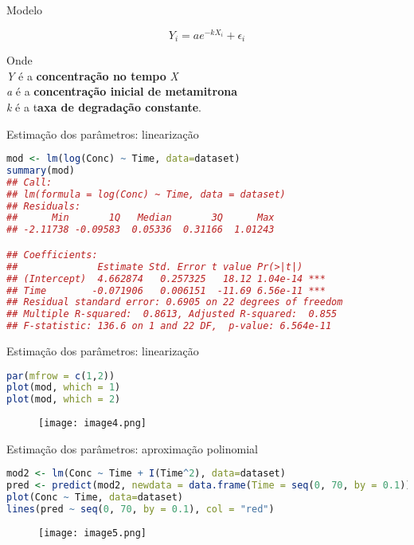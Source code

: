 \documentclass[xcolor=dvipsnames]{beamer}
\begin{document}
         \begin{frame}{Modelo}

        \textit{$$Y_{i} = ae^{-kX_i}+\epsilon_i$$}

       Onde \\
       \textit{Y} é a \textbf{concentração no tempo} \textit{X} \\
       \textit{a} é a \textbf{concentração inicial de metamitrona} \\
       \textit{k} é a t\textbf{axa de degradação constante}.
             
         \end{frame}

        \begin{frame}[fragile]{Estimação dos parâmetros: linearização}
           \begin{lstlisting}[language=R]
mod <- lm(log(Conc) ~ Time, data=dataset)
summary(mod)
## Call:
## lm(formula = log(Conc) ~ Time, data = dataset)
## Residuals:
##      Min       1Q   Median       3Q      Max 
## -2.11738 -0.09583  0.05336  0.31166  1.01243 

## Coefficients:
##              Estimate Std. Error t value Pr(>|t|)    
## (Intercept)  4.662874   0.257325   18.12 1.04e-14 ***
## Time        -0.071906   0.006151  -11.69 6.56e-11 ***
## Residual standard error: 0.6905 on 22 degrees of freedom
## Multiple R-squared:  0.8613, Adjusted R-squared:  0.855 
## F-statistic: 136.6 on 1 and 22 DF,  p-value: 6.564e-11
           \end{lstlisting}
        \end{frame} 
        
        \begin{frame}[fragile]{Estimação dos parâmetros: linearização}
           \begin{lstlisting}[language=R]
par(mfrow = c(1,2))
plot(mod, which = 1)
plot(mod, which = 2)
           \end{lstlisting}
           \begin{figure}[h]
           \texttt{[image: image4.png]}        
          \end{figure}          
        \end{frame}

         \begin{frame}[fragile]{Estimação dos parâmetros: aproximação polinomial}
           \begin{lstlisting}[language=R]
mod2 <- lm(Conc ~ Time + I(Time^2), data=dataset)
pred <- predict(mod2, newdata = data.frame(Time = seq(0, 70, by = 0.1)))
plot(Conc ~ Time, data=dataset)
lines(pred ~ seq(0, 70, by = 0.1), col = "red")
           \end{lstlisting}
           \begin{figure}[h]
           \texttt{[image: image5.png]}        
          \end{figure} 
           
        \end{frame}
\end{document}
